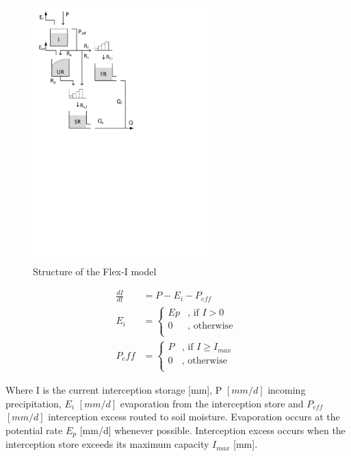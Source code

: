 { 																	%
\begin{figure}
\includegraphics[trim=1cm 15cm 7cm 1cm,width=7cm,keepaspectratio]{./files/26_schematic.pdf}
\caption{Structure of the Flex-I model} \label{fig:26_schematic}
\end{figure}

\begin{align}
	\frac{dI}{dt} &= P-E_i-P_{eff} \\
	E_i &= \begin{cases}
		Ep &\text{, if } I > 0\\
		0 &\text{, otherwise }\\
	\end{cases}\\
	P_eff &= \begin{cases}
		P &\text{, if } I \geq I_{max}\\
		0 &\text{, otherwise }\\
	\end{cases}	
\end{align}

Where I is the current interception storage [mm], P $[mm/d]$ incoming precipitation, $E_i$ $[mm/d]$ evaporation from the interception store and $P_{eff}$  $[mm/d]$ interception excess routed to soil moisture. Evaporation occurs at the potential rate $E_p$ [mm/d] whenever possible. Interception excess occurs when the interception store exceeds its maximum capacity $I_{max}$ [mm].

} %
\vspace{1cm}

